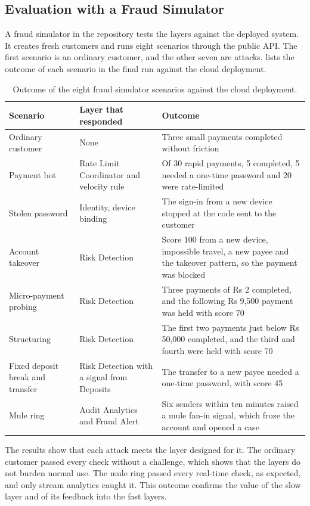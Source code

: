 \documentclass[11pt,a4paper]{article}
\begin{document}
\subsection{Evaluation with a Fraud Simulator}
\label{sec:fraud-eval}

A fraud simulator in the repository tests the layers against the deployed system. It creates fresh customers and runs eight scenarios through the public API. The first scenario is an ordinary customer, and the other seven are attacks.  lists the outcome of each scenario in the final run against the cloud deployment.

\begin{table}[H]\centering\small
\caption{Outcome of the eight fraud simulator scenarios against the cloud deployment.}\label{tab:simulator}
\begin{tabularx}{\linewidth}{@{}L{3.1cm}L{3.6cm}Y@{}}
\toprule
Scenario & Layer that responded & Outcome \\
\midrule
Ordinary customer & None & Three small payments completed without friction \\
Payment bot & Rate Limit Coordinator and velocity rule & Of 30 rapid payments, 5 completed, 5 needed a one-time password and 20 were rate-limited \\
Stolen password & Identity, device binding & The sign-in from a new device stopped at the code sent to the customer \\
Account takeover & Risk Detection & Score 100 from a new device, impossible travel, a new payee and the takeover pattern, so the payment was blocked \\
Micro-payment probing & Risk Detection & Three payments of Rs 2 completed, and the following Rs 9,500 payment was held with score 70 \\
Structuring & Risk Detection & The first two payments just below Rs 50,000 completed, and the third and fourth were held with score 70 \\
Fixed deposit break and transfer & Risk Detection with a signal from Deposits & The transfer to a new payee needed a one-time password, with score 45 \\
Mule ring & Audit Analytics and Fraud Alert & Six senders within ten minutes raised a mule fan-in signal, which froze the account and opened a case \\
\bottomrule
\end{tabularx}
\end{table}

The results show that each attack meets the layer designed for it. The ordinary customer passed every check without a challenge, which shows that the layers do not burden normal use. The mule ring passed every real-time check, as expected, and only stream analytics caught it. This outcome confirms the value of the slow layer and of its feedback into the fast layers.
\end{document}
